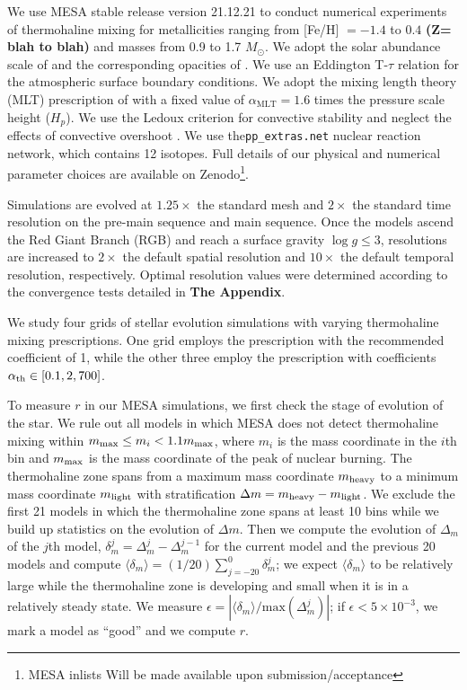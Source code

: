 We use MESA stable release version 21.12.21 to conduct numerical experiments of thermohaline mixing for metallicities ranging from [Fe/H] $= -1.4$ to $0.4$ \textbf{(Z= blah to blah)} and masses from 0.9 to 1.7 $M_{\odot}$. We adopt the solar abundance scale of \citet{GrevesseSauval1998} and the corresponding opacities of \citet{IglesiasRogers1996}. We use an Eddington T-$\tau$ relation for the atmospheric surface boundary conditions.
We adopt the mixing length theory (MLT) prescription of \citet{Cox1980} with a fixed value of $\alpha_{\text{MLT}}= 1.6$ times the pressure scale height ($H_p$).  We use the Ledoux criterion for convective stability and neglect the effects of convective overshoot \citep{Ledoux}. We use the\verb|pp_extras.net| nuclear reaction network, which contains 12 isotopes. Full details of our physical and numerical parameter choices are available on Zenodo\footnote{MESA inlists Will be made available upon submission/acceptance}. 

Simulations are evolved at $1.25\times$ the standard mesh and $2\times$ the standard time resolution on the pre-main sequence and main sequence. Once the models ascend the Red Giant Branch (RGB) and reach a surface gravity $\log g \le 3$, resolutions are increased to $2\times$ the default spatial resolution and $10\times$ the default temporal resolution, respectively. Optimal resolution values were determined according to the convergence tests detailed in \textbf{The Appendix}. 

We study four grids of stellar evolution simulations with varying thermohaline mixing prescriptions. One grid employs the \citet{brown_etal_2013} prescription with the recommended coefficient of 1, while the other three employ the \citet{kippenhahn_etal_1980} prescription with coefficients $\alpha_{\rm th} \in [0.1, 2, 700]$.


To measure $r$ in our MESA simulations, we first check the stage of evolution of the star.
We rule out all models in which MESA does not detect thermohaline mixing within $m_{\rm max} \leq m_i < 1.1 m_{\rm max}$, where $m_i$ is the mass coordinate in the $i$th bin and $m_{\rm max}$ is the mass coordinate of the peak of nuclear burning.
The thermohaline zone spans from a maximum mass coordinate $m_{\rm heavy}$ to a minimum mass coordinate $m_{\rm light}$ with stratification $\Delta m = m_{\rm heavy} - m_{\rm light}$.
We exclude the first 21 models in which the thermohaline zone spans at least 10 bins while we build up statistics on the evolution of $\Delta m$.
Then we compute the evolution of $\Delta_{m}$ of the $j$th model, $\delta_m^j = \Delta_m^{j} - \Delta_m^{j-1}$ for the current model and the previous 20 models and compute $\langle \delta_m \rangle = (1/20)\sum_{j=-20}^0 \delta_m^j$; we expect $\langle \delta_m \rangle$ to be relatively large while the thermohaline zone is developing and small when it is in a relatively steady state.
We measure $\epsilon = |\langle \delta_m \rangle / \mathrm{max}(\Delta_m^j)|$; if $\epsilon < 5 \times 10^{-3}$, we mark a model as ``good'' and we compute $r$.

